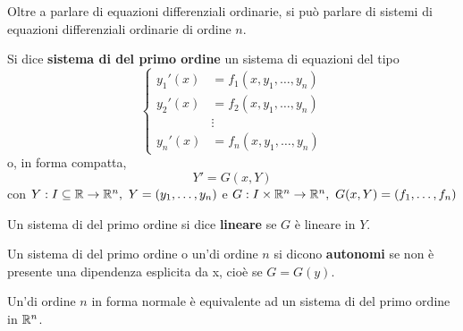 Oltre a parlare di equazioni differenziali ordinarie, si può parlare di sistemi di equazioni differenziali ordinarie di ordine $n$.
\begin{definition} \label{Def: Sistema di ode del primo ordine}
    Si dice \textbf{sistema di \odes del primo ordine} un sistema di equazioni del tipo
    \begin{equation}
        \left\{
        \begin{aligned}
        y_1'(x) &= f_1(x, y_1, \dots, y_n)\\
         y_2'(x) &= f_2(x, y_1, \dots, y_n)\\       
        &\vdots \\
        y_n'(x) &= f_n(x, y_1, \dots, y_n)
        \end{aligned} \right.
\end{equation}
o, in forma compatta, 
\begin{equation}
    Y'=G(x, Y)
\end{equation}
con $Y: I \subseteq \mathbb{R} \to \mathbb{R}^n,\ Y=(y_1, \dots, y_n)$ e $G:I \times \mathbb{R}^n \to \mathbb{R}^n,\ G(x, Y)=(f_1, \dots, f_n)$
\end{definition}
\begin{definition} \label{Def: Sistema di ode lineare}
    Un sistema di \odes del primo ordine si dice \textbf{lineare} se $G$ è lineare in $Y$.
\end{definition}
\begin{definition} \label{Def: Sistema/Ode autonoma}
    Un sistema di \odes del primo ordine o un'\ode di ordine $n$ si dicono \textbf{autonomi} se non è presente una dipendenza esplicita da x, cioè se $G=G(y)$.
\end{definition}
\begin{lemma}
    Un'\ode di ordine $n$ in forma normale è equivalente ad un sistema di \odes del primo ordine in $\mathbb{R}^n$.
\end{lemma}
